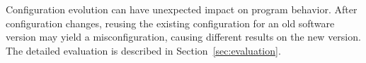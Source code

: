 Configuration evolution can have unexpected impact on
program behavior. After configuration changes, reusing
the existing configuration for an old software version
may yield a misconfiguration, causing different results
on the new version.  The detailed evaluation is
described in Section~\ref{sec:evaluation}.














